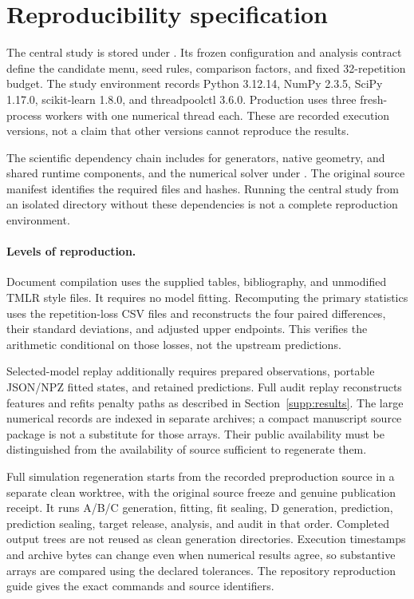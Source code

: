 
\section{Reproducibility specification}\label{supp:reproducibility}
The central study is stored under . Its frozen configuration and analysis contract define the candidate menu, seed rules, comparison factors, and fixed 32-repetition budget. The study environment records Python 3.12.14, NumPy 2.3.5, SciPy 1.17.0, scikit-learn 1.8.0, and threadpoolctl 3.6.0. Production uses three fresh-process workers with one numerical thread each. These are recorded execution versions, not a claim that other versions cannot reproduce the results.

The scientific dependency chain includes  for generators, native geometry, and shared runtime components, and the numerical solver under . The original source manifest identifies the required files and hashes. Running the central study from an isolated directory without these dependencies is not a complete reproduction environment.

\paragraph{Levels of reproduction.}
Document compilation uses the supplied tables, bibliography, and unmodified TMLR style files. It requires no model fitting. Recomputing the primary statistics uses the repetition-loss CSV files and reconstructs the four paired differences, their standard deviations, and adjusted upper endpoints. This verifies the arithmetic conditional on those losses, not the upstream predictions.

Selected-model replay additionally requires prepared observations, portable JSON/NPZ fitted states, and retained predictions. Full audit replay reconstructs features and refits penalty paths as described in Section~\ref{supp:results}. The large numerical records are indexed in separate archives; a compact manuscript source package is not a substitute for those arrays. Their public availability must be distinguished from the availability of source sufficient to regenerate them.

Full simulation regeneration starts from the recorded preproduction source in a separate clean worktree, with the original source freeze and genuine publication receipt. It runs A/B/C generation, fitting, fit sealing, D generation, prediction, prediction sealing, target release, analysis, and audit in that order. Completed output trees are not reused as clean generation directories. Execution timestamps and archive bytes can change even when numerical results agree, so substantive arrays are compared using the declared tolerances. The repository reproduction guide gives the exact commands and source identifiers.


